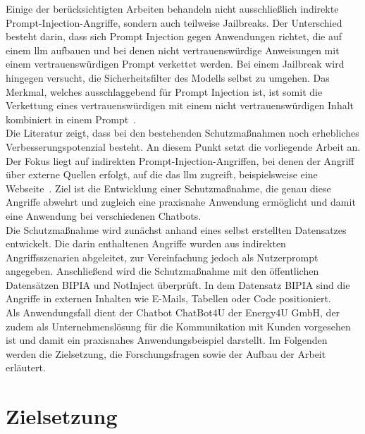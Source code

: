 Einige der berücksichtigten Arbeiten behandeln nicht ausschließlich indirekte Prompt-Injection-Angriffe, sondern auch teilweise Jailbreaks. Der Unterschied
besteht darin, dass sich Prompt Injection gegen Anwendungen richtet, die auf einem \ac{llm} aufbauen und bei denen nicht vertrauenswürdige Anweisungen mit einem 
vertrauenswürdigen Prompt verkettet werden. Bei einem Jailbreak wird hingegen versucht, die Sicherheitsfilter des Modells selbst zu umgehen. Das Merkmal, welches 
ausschlaggebend für Prompt Injection ist, ist somit die Verkettung eines vertrauenswürdigen mit einem nicht vertrauenswürdigen Inhalt kombiniert in einem Prompt~\cite{e05}. \\
Die Literatur zeigt, dass bei den bestehenden Schutzmaßnahmen noch erhebliches Verbesserungspotenzial besteht. An diesem Punkt setzt die vorliegende Arbeit an. Der 
Fokus liegt auf indirekten Prompt-Injection-Angriffen, bei denen der Angriff über externe Quellen erfolgt, auf die das \ac{llm} zugreift, beispielsweise eine Webseite~\cite[2\psq]{pi6}.
Ziel ist die Entwicklung einer Schutzmaßnahme, die genau diese Angriffe abwehrt und zugleich eine praxisnahe Anwendung ermöglicht und damit eine Anwendung bei verschiedenen
Chatbots. \\
Die Schutzmaßnahme wird zunächst anhand eines selbst erstellten Datensatzes entwickelt. Die darin enthaltenen Angriffe wurden aus indirekten Angriffsszenarien abgeleitet, zur
Vereinfachung jedoch als Nutzerprompt angegeben. Anschließend wird die Schutzmaßnahme mit den öffentlichen Datensätzen BIPIA und NotInject überprüft. In dem Datensatz
BIPIA sind die Angriffe in externen Inhalten wie E-Mails, Tabellen oder Code positioniert. \\
Als Anwendungsfall dient der Chatbot ChatBot4U der Energy4U GmbH, der zudem als Unternehmenslösung für die Kommunikation mit Kunden vorgesehen ist und damit ein 
praxisnahes Anwendungsbeispiel darstellt. Im Folgenden werden die Zielsetzung, die Forschungsfragen sowie der Aufbau der Arbeit erläutert.

\section{Zielsetzung}

